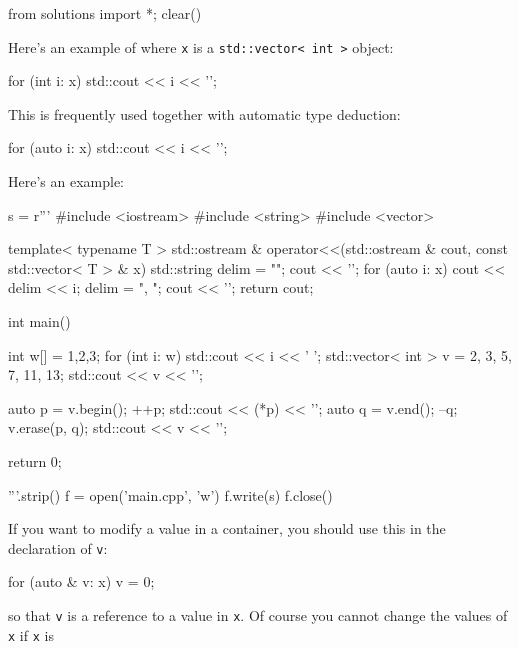 \begin{python0}
from solutions import *; clear()
\end{python0}

Here's an example of
where \verb!x! is a
\verb!std::vector< int >! object:
\begin{console}[fontsize=\footnotesize]
for (int i: x)
{
    std::cout << i << '\n';
}
\end{console}
This is frequently used together with automatic type deduction:
\begin{console}[fontsize=\footnotesize]
for (auto i: x)
{
    std::cout << i << '\n';
}
\end{console}

Here's an example:
\begin{python}
s = r'''
#include <iostream>
#include <string>
#include <vector>

template< typename T >
std::ostream & operator<<(std::ostream & cout,
                          const std::vector< T > & x)
{
    std::string delim = "";                            
    cout << '{';                            
    for (auto i: x)
    {
        cout << delim << i;
        delim = ", ";
    }
    cout << '}';
    return cout;
}

int main()
{
    int w[] = {1,2,3};
    for (int i: w)
    {
        std::cout << i << ' ';
    }
    std::vector< int > v = {2, 3, 5, 7, 11, 13};
    std::cout << v << '\n';

    auto p = v.begin();
    ++p;
    std::cout << (*p) << '\n';
    auto q = v.end();
    --q;
    v.erase(p, q);
    std::cout << v << '\n';
    
    return 0;
}
'''.strip()
f = open('main.cpp', 'w')
f.write(s)
f.close()
\end{python}
If you want to modify a value in a container, you should use this in
the declaration of \verb!v!:
\begin{console}[fontsize=\footnotesize]
for (auto & v: x)
{
    v = 0;
}
\end{console}
so that \verb!v! is a reference to a value in \verb!x!.
Of course you cannot change the values of \verb!x! if \verb!x! is
